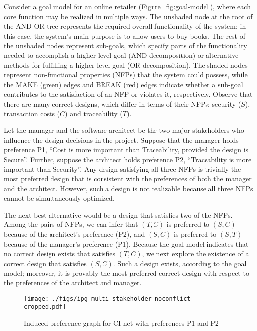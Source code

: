 Consider a goal model for an online retailer (Figure~\ref{fig:goal-model}), where each core function may be realized in multiple ways. The unshaded node at the root of the AND-OR tree represents the required overall functionality of the system: in this case, the system's main purpose is to allow users to buy books. The rest of the unshaded nodes represent sub-goals, which specify parts of the functionality needed to accomplish a higher-level goal (AND-decomposition) or alternative methods for fulfilling a higher-level goal (OR-decomposition). The shaded nodes represent non-functional properties (NFPs) that the system could possess, while the MAKE (green) edges and BREAK (red) edges indicate whether a sub-goal contributes to the satisfaction of an NFP or violates it, respectively. Observe that
there are many correct designs, which differ in terms of their NFPs: security ($S$), transaction
 costs ($C$) and traceability ($T$). 

Let the manager and the software architect be the two major stakeholders 
who influence the design decisions in the project. Suppose that the
manager holds preference P1, ``Cost is more important than Traceability, 
provided the design is Secure''. Further, suppose the architect holds 
preference P2, ``Traceability is more important than Security''. Any
design satisfying all three NFPs is trivially the most preferred design
that is consistent with the preferences of both the manager and the
architect. However, such a design is not realizable because all three
NFPs cannot be simultaneously optimized. 

The next best alternative would be a design that satisfies 
two of the NFPs. Among the pairs of NFPs, we can infer that $(T,C)$ is preferred to $(S,C)$ because of
the architect's preference (P2), and $(S,C)$ is preferred to $(S,T)$ because of the manager's preference (P1).
Because the goal model indicates that no correct design exists that satisfies $(T,C)$, we next explore the existence
of a correct design that satisfies $(S,C)$. Such a design exists, according to the goal model; moreover, it is provably the
most preferred correct design with respect to the preferences of the architect and manager.

\begin{figure}%
\centering
\texttt{[image: ./figs/ipg-multi-stakeholder-noconflict-cropped.pdf]}%
\caption{Induced preference graph for CI-net with preferences P1 and P2}%
\label{fig:ipg-no-conflict}%
\end{figure}

